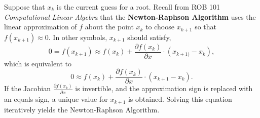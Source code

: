 Suppose that $x_k$ is the current guess for a root. Recall from ROB 101 \textit{Computational Linear Algebra} that the \textbf{Newton-Raphson Algorithm} uses the linear approximation of $f$ about the point $x_k$ to choose $x_{k+1}$ so that $f(x_{k+1})\approx 0$.  In other symbols, $x_{k+1}$ should satisfy,
\begin{equation}
    \label{eq:NewtonMethodVector01}
    0 = f(x_{k+1}) \approx f(x_k) + \frac{\partial f(x_k)}{\partial x}\cdot (x_{k+1)} - x_k),
\end{equation}
which is equivalent to
\begin{equation}
    \label{eq:BasicNewtonRaphson}
       0  \approx f(x_k) + \frac{\partial f(x_k)}{\partial x}\cdot (x_{k+1} - x_k).
\end{equation}
If the Jacobian $\frac{\partial f(x_k)}{\partial x}$ is invertible, and the approximation sign is replaced with an equals sign, a unique value for $x_{k+1}$ is obtained. Solving this equation iteratively yields the Newton-Raphson Algorithm.

